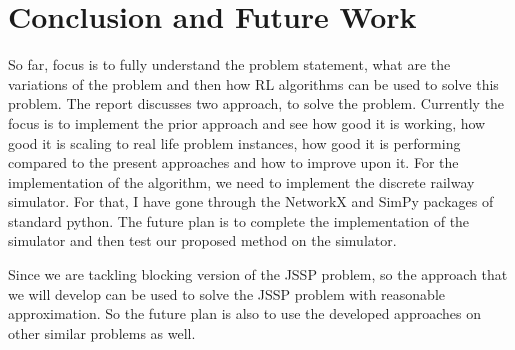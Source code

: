 \chapter{Conclusion and Future Work}

So far, focus is to fully understand the problem statement, what are the variations of the 
problem and then how RL algorithms can be used to solve this problem. The report discusses
two approach, to solve the problem. Currently the focus is to implement the prior approach and
see how good it is working, how good it is scaling to real life problem instances, how good it is 
performing compared to the present approaches and how to improve upon it. For the implementation of the 
algorithm, we need to implement the discrete railway simulator. For that, I have gone through the NetworkX and SimPy 
packages of standard python. The future plan is to complete the implementation of the simulator and then test 
our proposed method on the simulator.

Since we are tackling blocking version of the JSSP problem, so the approach that we will 
develop can be used to solve the JSSP problem with reasonable approximation. So the future plan is also 
to use the developed approaches on other similar problems as well.
